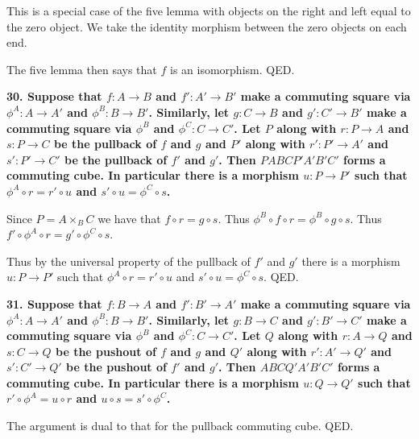 \documentclass[12pt]{article}
\begin{document}
This is a special case of the five lemma with objects on the right and left equal to the zero object. We take the identity morphism between the zero objects on each end.

The five lemma then says that $f$ is an isomorphism. QED.

\textbf{30. Suppose that $f : A \to B$ and $f' : A' \to B'$ make a commuting square via $\phi^A : A \to A'$ and $\phi^B : B \to B'$. Similarly, let $g : C \to B$ and $g' : C' \to B'$ make a commuting square via $\phi^B$ and $\phi^C : C \to C'$. Let $P$ along with $r : P \to A$ and $s : P \to C$ be the pullback of $f$ and $g$ and $P'$ along with $r' : P' \to A'$ and $s' : P' \to C'$ be the pullback of $f'$ and $g'$. Then $PABCP'A'B'C'$ forms a commuting cube. In particular there is a morphism $u : P \to P'$ such that $\phi^A\circ r = r'\circ u$ and $s'\circ u = \phi^C\circ s$.}

Since $P = A\times_B C$ we have that $f\circ r = g\circ s$. Thus $\phi^B\circ f\circ r = \phi^B\circ g\circ s$. Thus $f'\circ \phi^A\circ r = g'\circ \phi^C\circ s$.

Thus by the universal property of the pullback of $f'$ and $g'$ there is a morphism $u : P \to P'$ such that $\phi^A\circ r = r'\circ u$ and $s'\circ u = \phi^C\circ s$. QED.

\textbf{31. Suppose that $f : B \to A$ and $f' : B' \to A'$ make a commuting square via $\phi^A : A \to A'$ and $\phi^B : B \to B'$. Similarly, let $g : B \to C$ and $g' : B' \to C'$ make a commuting square via $\phi^B$ and $\phi^C : C \to C'$. Let $Q$ along with $r : A \to Q$ and $s : C \to Q$ be the pushout of $f$ and $g$ and $Q'$ along with $r' : A' \to Q'$ and $s' : C' \to Q'$ be the pushout of $f'$ and $g'$. Then $ABCQ'A'B'C'$ forms a commuting cube. In particular there is a morphism $u : Q \to Q'$ such that $r'\circ \phi^A = u\circ r$ and $u\circ s = s'\circ \phi^C$.}

The argument is dual to that for the pullback commuting cube. QED.
\end{document}
